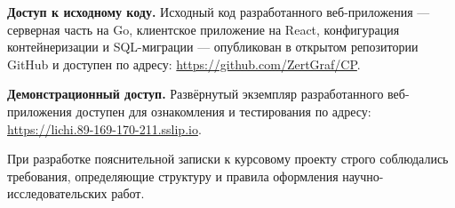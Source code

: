 \textbf{Доступ к исходному коду.} Исходный код разработанного веб-приложения ---
серверная часть на Go, клиентское приложение на React, конфигурация
контейнеризации и SQL-миграции --- опубликован в открытом репозитории GitHub
и доступен по адресу: \url{https://github.com/ZertGraf/CP}.

\textbf{Демонстрационный доступ.} Развёрнутый экземпляр разработанного
веб-приложения доступен для ознакомления и тестирования по адресу:
\url{https://lichi.89-169-170-211.sslip.io}.

При разработке пояснительной записки к курсовому проекту строго соблюдались
требования, определяющие структуру и правила оформления
научно-исследовательских работ.